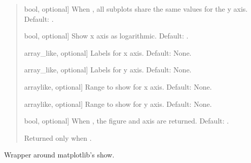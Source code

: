 \documentclass[letterpaper,10pt,english]{sphinxmanual}
\begin{document}
\begin{fulllineitems}
\begin{quote}
\begin{description}
\begin{description}
\sphinxlineitem{\sphinxstylestrong{sharey}}{[}bool, optional{]}
\sphinxAtStartPar
When , all subplots share the same values for the y axis.
Default: .

\sphinxlineitem{\sphinxstylestrong{log}}{[}bool, optional{]}
\sphinxAtStartPar
Show x axis as logarithmic. Default: .

\sphinxlineitem{\sphinxstylestrong{xlabels}}{[}array\_like, optional{]}
\sphinxAtStartPar
Labels for x axis. Default: None.

\sphinxlineitem{\sphinxstylestrong{ylabels}}{[}array\_like, optional{]}
\sphinxAtStartPar
Labels for y axis. Default: None.

\sphinxlineitem{\sphinxstylestrong{range\_x}}{[}array\sphinxhyphen{}like, optional{]}
\sphinxAtStartPar
Range to show for x axis. Default: None.

\sphinxlineitem{\sphinxstylestrong{range\_y}}{[}array\sphinxhyphen{}like, optional{]}
\sphinxAtStartPar
Range to show for y axis. Default: None.

\sphinxlineitem{\sphinxstylestrong{returns}}{[}bool, optional{]}
\sphinxAtStartPar
When , the figure and axis are returned. Default: .

\end{description}

\begin{description}
\sphinxAtStartPar
Returned only when .

\end{description}

\end{description}\end{quote}

\end{fulllineitems}


\begin{fulllineitems}
\label{\detokenize{modules/dsptools.plots:dsptools.plots.show}}
\pysigstartsignatures
{}
\pysigstopsignatures
\sphinxAtStartPar
Wrapper around matplotlib’s show.

\end{fulllineitems}
\end{document}
